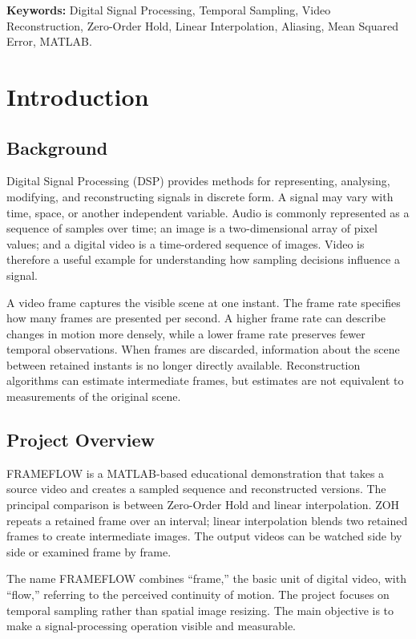 \documentclass[12pt,a4paper,oneside]{report}
\begin{document}
\textbf{Keywords:} Digital Signal Processing, Temporal Sampling, Video Reconstruction, Zero-Order Hold, Linear Interpolation, Aliasing, Mean Squared Error, MATLAB.

\tableofcontents
\listoffigures
\listoftables
\clearpage
{}

\chapter{Introduction}
\section{Background}
Digital Signal Processing (DSP) provides methods for representing, analysing, modifying, and reconstructing signals in discrete form. A signal may vary with time, space, or another independent variable. Audio is commonly represented as a sequence of samples over time; an image is a two-dimensional array of pixel values; and a digital video is a time-ordered sequence of images. Video is therefore a useful example for understanding how sampling decisions influence a signal.

A video frame captures the visible scene at one instant. The frame rate specifies how many frames are presented per second. A higher frame rate can describe changes in motion more densely, while a lower frame rate preserves fewer temporal observations. When frames are discarded, information about the scene between retained instants is no longer directly available. Reconstruction algorithms can estimate intermediate frames, but estimates are not equivalent to measurements of the original scene.

\section{Project Overview}
FRAMEFLOW is a MATLAB-based educational demonstration that takes a source video and creates a sampled sequence and reconstructed versions. The principal comparison is between Zero-Order Hold and linear interpolation. ZOH repeats a retained frame over an interval; linear interpolation blends two retained frames to create intermediate images. The output videos can be watched side by side or examined frame by frame.

The name FRAMEFLOW combines “frame,” the basic unit of digital video, with “flow,” referring to the perceived continuity of motion. The project focuses on temporal sampling rather than spatial image resizing. The main objective is to make a signal-processing operation visible and measurable.
\end{document}
